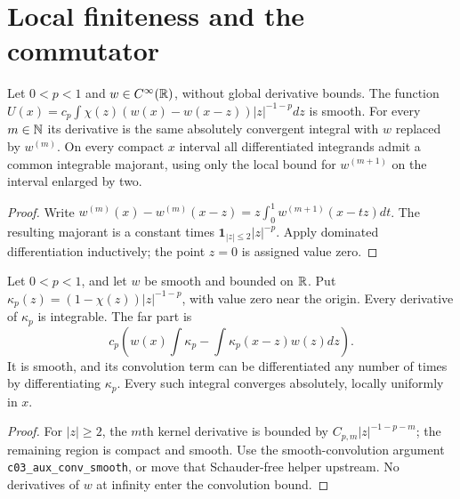 \section{Local finiteness and the commutator}

\begin{lemma}
  \label{lem:c12_frac_near_smooth}
  Let $0<p<1$ and $w\in C^\infty(\mathbb{R})$, without global derivative bounds.
  The function $U(x)=c_p\int\chi(z)(w(x)-w(x-z))|z|^{-1-p}dz$ is smooth.
  For every $m\in\mathbb{N}$ its derivative is the same absolutely convergent integral with
  $w$ replaced by $w^{(m)}$. On every compact $x$ interval all differentiated integrands
  admit a common integrable majorant, using only the local bound for $w^{(m+1)}$ on the
  interval enlarged by two.
\end{lemma}
\begin{proof}
  Write $w^{(m)}(x)-w^{(m)}(x-z)=z\int_0^1w^{(m+1)}(x-tz)dt$.
  The resulting majorant is a constant times $\mathbf1_{|z|\le2}|z|^{-p}$.
  Apply dominated differentiation inductively; the point $z=0$ is assigned value zero.
\end{proof}

\begin{lemma}
  \label{lem:c12_frac_far_smooth}
  Let $0<p<1$, and let $w$ be smooth and bounded on $\mathbb{R}$.
  Put $\kappa_p(z)=(1-\chi(z))|z|^{-1-p}$, with value zero near the origin.
  Every derivative of $\kappa_p$ is integrable. The far part is
  \[
    c_p\left(w(x)\int\kappa_p-\int\kappa_p(x-z)w(z)dz\right).
  \]
  It is smooth, and its convolution term can be differentiated any number of times by
  differentiating $\kappa_p$. Every such integral converges absolutely, locally uniformly in $x$.
\end{lemma}
\begin{proof}
  For $|z|\ge2$, the $m$th kernel derivative is bounded by $C_{p,m}|z|^{-1-p-m}$;
  the remaining region is compact and smooth. Use the smooth-convolution
  argument \texttt{c03\_aux\_conv\_smooth}, or move that Schauder-free helper upstream.
  No derivatives of $w$ at infinity enter the convolution bound.
\end{proof}

